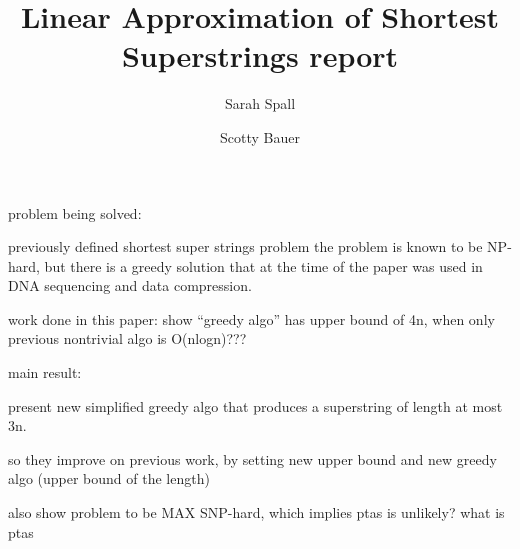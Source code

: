 \documentclass[11pt,titlepage,margin=.5in]{article}
\begin{document}
\title{Linear Approximation of Shortest Superstrings report}
\author{Sarah Spall}
\author{Scotty Bauer}
\maketitle

problem being solved:

previously defined shortest super strings problem
the problem is known to be NP-hard, but there is a 
greedy solution that at the time of the paper was used
in DNA sequencing and data compression.  

work done in this paper:
show ``greedy algo'' has upper bound of 4n, when only
previous nontrivial algo is O(nlogn)???



main result:

present new simplified greedy algo that produces
a superstring of length at most 3n.  

so they improve on previous work, by setting new upper bound
and new greedy algo (upper bound of the length)

also show problem to be MAX SNP-hard, which implies 
ptas is unlikely? what is ptas
\end{document}
